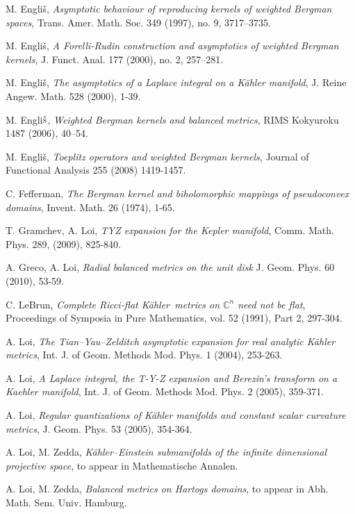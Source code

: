 \documentclass[11pt, reqno]{amsart}
\begin{document}
\begin{thebibliography}{99}
M. Engli\v{s},
{\em Asymptotic behaviour of reproducing kernels of weighted Bergman spaces},
Trans. Amer. Math. Soc. 349 (1997), no. 9, 3717--3735.

 M. Engli\v{s}, {\em A Forelli-Rudin construction and asymptotics of weighted Bergman kernels}, J. Funct. Anal. 177 (2000), no. 2, 257--281.

 M. Engli\v{s},
{\em The asymptotics of a Laplace integral on a K\"{a}hler manifold},
J. Reine Angew. Math. 528 (2000), 1-39.

 M.  Engli$\rm \check{s}$, \emph{Weighted Bergman kernels and balanced metrics}, RIMS Kokyuroku 1487 (2006), 40--54.

 M. Engli\v{s},
{\em Toeplitz operators and weighted Bergman kernels}, Journal of Functional Analysis 255 (2008) 1419-1457.

 C. Fefferman,
{\em The Bergman kernel and biholomorphic mappings of pseudoconvex domains}, Invent. Math. 26 (1974), 1-65.

 T. Gramchev, A. Loi, {\em TYZ expansion for the Kepler manifold}, Comm. Math.  Phys. 289, (2009), 825-840.

 A. Greco, A. Loi, {\em Radial balanced metrics on the unit disk} J. Geom. Phys. 60  (2010), 53-59.

 C. LeBrun,
{\em Complete Ricci-flat {K\"{a}hler}\ metrics on ${\mathbb{C}}^n$ need not be
flat}, Proceedings of Symposia in Pure Mathematics, vol. 52
(1991), Part 2, 297-304.

 A. Loi,
{\em The Tian--Yau--Zelditch asymptotic expansion
for real analytic K\"{a}hler metrics},
Int. J.  of Geom. Methods
Mod. Phys. 1 (2004), 253-263.

 A. Loi,
{\em A Laplace integral, the T-Y-Z expansion and Berezin's transform
on a Kaehler manifold},
Int. J.  of Geom. Methods
Mod. Phys. 2 (2005), 359-371.

A. Loi, \emph{Regular quantizations of K\"ahler manifolds and constant scalar curvature metrics},  J. Geom. Phys.  53 (2005), 354-364.

 A. Loi, M. Zedda, \emph{K\"ahler--Einstein  submanifolds of   the infinite dimensional  projective space}, to appear in Mathematische Annalen.

 A. Loi, M. Zedda, \emph{Balanced metrics on Hartogs domains}, to appear in Abh. Math. Sem. Univ. Hamburg.


\end{thebibliography}
\end{document}
